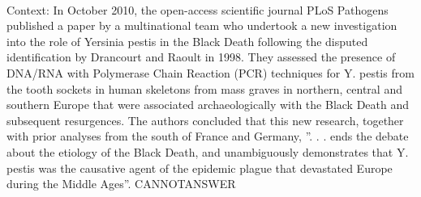 \documentclass[11pt,a4paper, onecolumn]{article}
\begin{document}
\\ Context: In October 2010, the open-access scientific journal PLoS Pathogens published a paper by a multinational team who undertook a new investigation into the role of Yersinia pestis in the Black Death following the disputed identification by Drancourt and Raoult in 1998. They assessed the presence of DNA/RNA with Polymerase Chain Reaction (PCR) techniques for Y. pestis from the tooth sockets in human skeletons from mass graves in northern, central and southern Europe that were associated archaeologically with the Black Death and subsequent resurgences. The authors concluded that this new research, together with prior analyses from the south of France and Germany, ''. . . ends the debate about the etiology of the Black Death, and unambiguously demonstrates that Y. pestis was the causative agent of the epidemic plague that devastated Europe during the Middle Ages''. CANNOTANSWER
\end{document}
